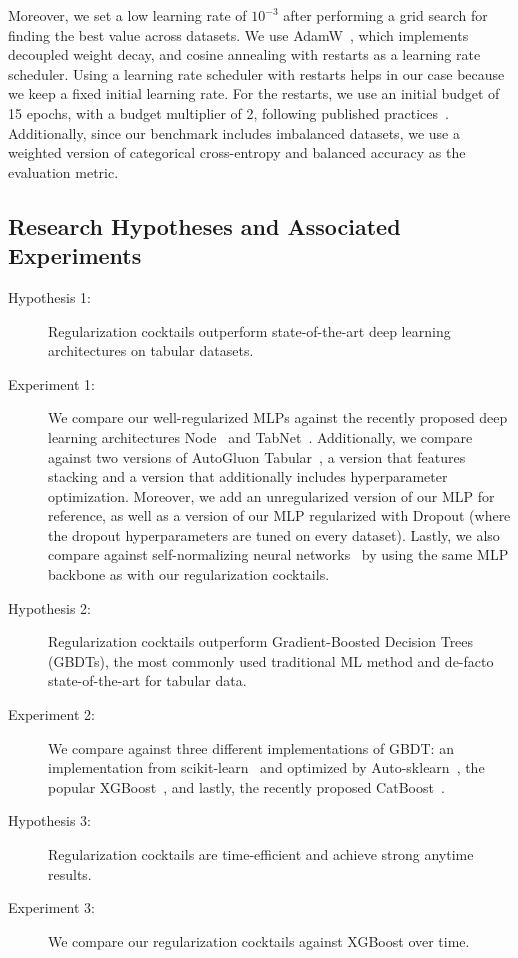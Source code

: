 Moreover, we set a low learning rate of $10^{-3}$ after performing a grid search for finding the best value across datasets. We use AdamW~\citep{loshchilov2018decoupled}, which implements decoupled weight decay, and cosine annealing with restarts \citep{loshchilov-ICLR17SGDR} as a learning rate scheduler. Using a learning rate scheduler with restarts helps in our case because we keep a fixed initial learning rate. For the restarts, we use an initial budget of  15 epochs, with a budget multiplier of 2, following published practices~\citep{DBLP:journals/corr/abs-2006-13799}. Additionally, since our benchmark includes imbalanced datasets, we use a weighted version of categorical cross-entropy and balanced accuracy \citep{brodersen2010balanced} as the evaluation metric.

\subsection{Research Hypotheses and Associated Experiments}
\label{sec:hypotheses}

\begin{description}

    \item[Hypothesis 1:] Regularization cocktails outperform state-of-the-art deep learning architectures on tabular datasets.

    \item[Experiment 1:] We compare our well-regularized MLPs against the recently proposed deep learning architectures Node~\citep{Popov2020Neural} and TabNet~\citep{49698}. Additionally, we compare against two versions of AutoGluon Tabular~\citep{DBLP:journals/corr/abs-2003-06505}, a version that features stacking and a version that additionally includes hyperparameter optimization. Moreover, we add an unregularized version of our MLP for reference, as well as a version of our MLP regularized with Dropout (where the dropout hyperparameters are tuned on every dataset). Lastly, we also compare against self-normalizing neural networks~\citep{klambauer2017self} by using the same MLP backbone as with our regularization cocktails.
    \item[Hypothesis 2:] Regularization cocktails outperform Gradient-Boosted Decision Trees (GBDTs), the most commonly used traditional ML method and de-facto state-of-the-art for tabular data.

    \item[Experiment 2:] We compare against three different implementations of GBDT: an implementation from scikit-learn~\cite{scikit-learn} and optimized by Auto-sklearn~\citep{autosklearn}, the popular XGBoost~\citep{Chen:2016:XST:2939672.2939785}, and lastly, the recently proposed CatBoost~\citep{prokhorenkova2018catboost}. 

    \item[Hypothesis 3:] Regularization cocktails are time-efficient and achieve strong anytime results.

    \item[Experiment 3:] We compare our regularization cocktails against XGBoost over time.
\end{description}

